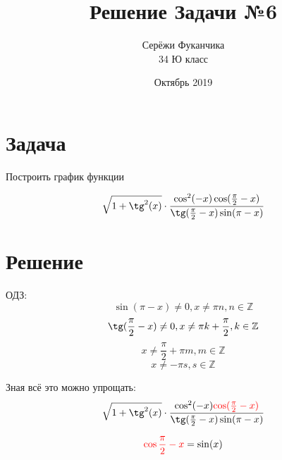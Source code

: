\documentclass{article}
\title{Решение Задачи №6}
\author{Серёжи Фуканчика\\34 Ю класс}
\date{Октябрь 2019}
\begin{document}
\maketitle
\section{Задача}
Построить график функции

$$\sqrt{1+\tg^2(x)}\cdot\frac{\cos^2(-x)\cos(\frac{\pi}{2}-x)}{\tg(\frac{\pi}{2}-x)\sin(\pi-x)}$$

\section{Решение}
ОДЗ:
$$\sin(\pi-x) \ne 0, x \ne \pi{}n, n\in{}\mathbb{Z}$$ $$\tg(\frac{\pi}{2}-x) \ne 0, x\ne\pi{}k+\frac{\pi}{2}, k\in{}\mathbb{Z}$$
$$x\ne\frac{\pi}{2}+\pi{}m, m\in{}\mathbb{Z}$$
$$x\ne-\pi{}s, s\in{}\mathbb{Z}$$

Зная всё это можно упрощать:
$$\sqrt{1+\tg^2(x)}\cdot\frac{\cos^2(-x){\color{red}\cos(\frac{\pi}{2}-x)}}{\tg(\frac{\pi}{2}-x)\sin(\pi-x)}$$

$${\color{red}\cos{\frac{\pi}{2}-x}}=\sin(x)$$
\end{document}
